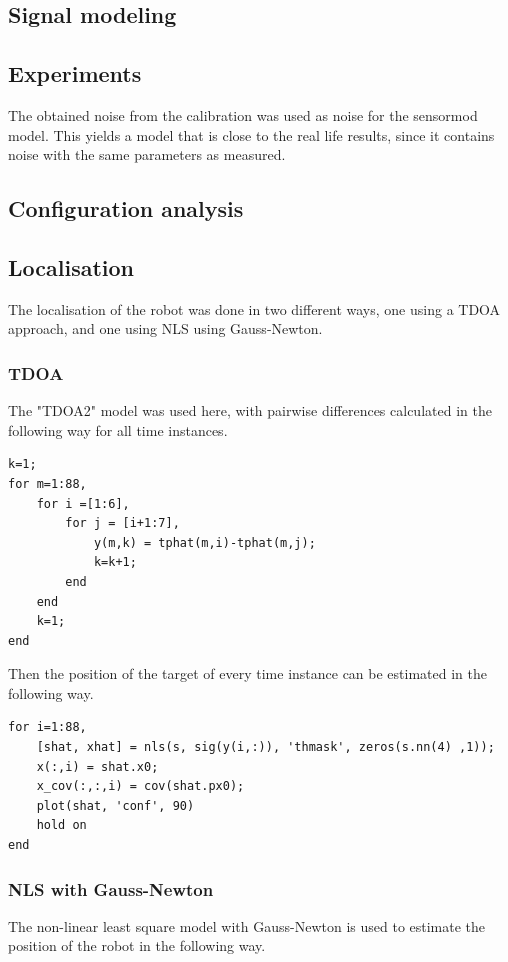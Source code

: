 \documentclass[11pt]{article}
\begin{document}
\subsection{Signal modeling}

\subsection{Experiments}
The obtained noise from the calibration was used as noise for the sensormod model. This yields a model that is close to the real life results, since it contains noise with the same parameters as measured. 

\subsection{Configuration analysis}

\subsection{Localisation}
The localisation of the robot was done in two different ways, one using a TDOA approach, and one using NLS using Gauss-Newton.

\subsubsection{TDOA}
The "TDOA2" model was used here, with pairwise differences calculated in the following way for all time instances.

\begin{verbatim}
k=1;
for m=1:88,
    for i =[1:6],
        for j = [i+1:7],
            y(m,k) = tphat(m,i)-tphat(m,j);
            k=k+1;
        end
    end
    k=1;
end
\end{verbatim}
Then the position of the target of every time instance can be estimated in the following way.
\begin{verbatim}
for i=1:88,
    [shat, xhat] = nls(s, sig(y(i,:)), 'thmask', zeros(s.nn(4) ,1));    
    x(:,i) = shat.x0;
    x_cov(:,:,i) = cov(shat.px0);
    plot(shat, 'conf', 90)
    hold on
end
\end{verbatim}


\subsubsection{NLS with Gauss-Newton}
The non-linear least square model with Gauss-Newton is used to estimate the position of the robot in the following way.
\end{document}
